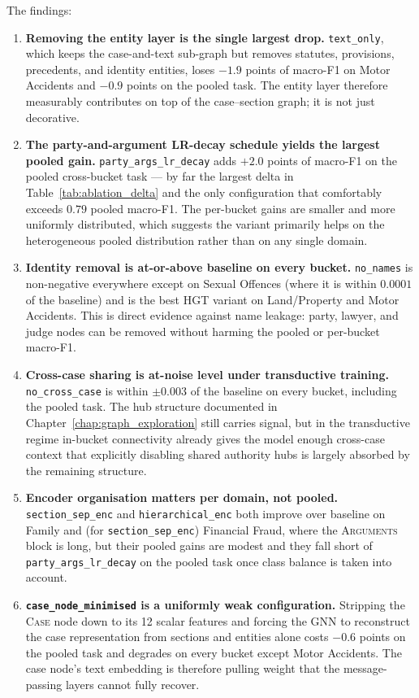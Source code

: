 The findings:

\begin{enumerate}
  \item \textbf{Removing the entity layer is the single largest
    drop.} \texttt{text\_only}, which keeps the case-and-text
    sub-graph but removes statutes, provisions, precedents, and
    identity entities, loses $-1.9$ points of macro-F1 on Motor
    Accidents and $-0.9$ points on the pooled task. The entity layer
    therefore measurably contributes on top of the case--section
    graph; it is not just decorative.
  \item \textbf{The party-and-argument LR-decay schedule yields the
    largest pooled gain.} \texttt{party\_args\_lr\_decay} adds
    $+2.0$ points of macro-F1 on the pooled cross-bucket task --- by
    far the largest delta in Table~\ref{tab:ablation_delta} and the
    only configuration that comfortably exceeds $0.79$ pooled
    macro-F1. The per-bucket gains are smaller and more
    uniformly distributed, which suggests the variant primarily
    helps on the heterogeneous pooled distribution rather than on
    any single domain.
  \item \textbf{Identity removal is at-or-above baseline on every
    bucket.} \texttt{no\_names} is non-negative everywhere except
    on Sexual Offences (where it is within $0.0001$ of the baseline)
    and is the best HGT variant on Land/Property and Motor
    Accidents. This is direct evidence against name leakage: party,
    lawyer, and judge nodes can be removed without harming the
    pooled or per-bucket macro-F1.
  \item \textbf{Cross-case sharing is at-noise level under
    transductive training.} \texttt{no\_cross\_case} is within
    $\pm 0.003$ of the baseline on every bucket, including the
    pooled task. The hub structure documented in
    Chapter~\ref{chap:graph_exploration} still carries signal, but
    in the transductive regime in-bucket connectivity already gives
    the model enough cross-case context that explicitly disabling
    shared authority hubs is largely absorbed by the remaining
    structure.
  \item \textbf{Encoder organisation matters per domain, not pooled.}
    \texttt{section\_sep\_enc} and \texttt{hierarchical\_enc} both
    improve over baseline on Family and (for
    \texttt{section\_sep\_enc}) Financial Fraud, where the
    \textsc{Arguments} block is long, but their pooled gains are
    modest and they fall short of \texttt{party\_args\_lr\_decay} on
    the pooled task once class balance is taken into account.
  \item \textbf{\texttt{case\_node\_minimised} is a uniformly weak
    configuration.} Stripping the \textsc{Case} node down to its 12
    scalar features and forcing the GNN to reconstruct the case
    representation from sections and entities alone costs $-0.6$
    points on the pooled task and degrades on every bucket except
    Motor Accidents. The case node's text embedding is therefore
    pulling weight that the message-passing layers cannot fully
    recover.
\end{enumerate}

